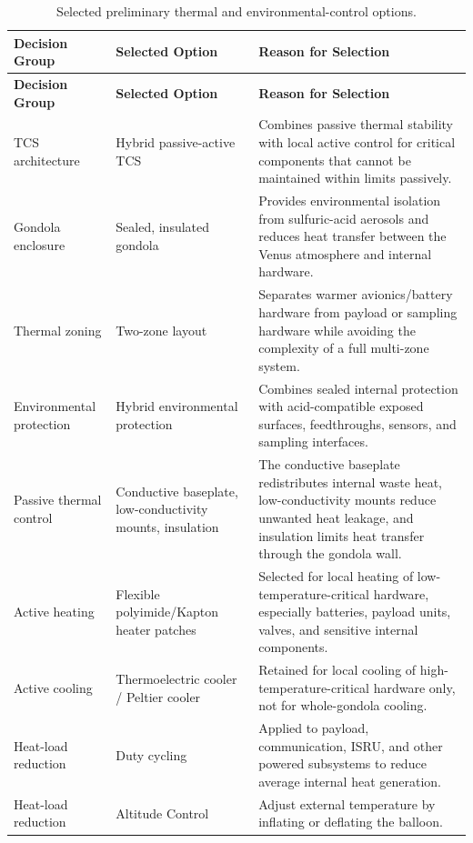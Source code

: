 \begin{longtable}{|p{2.5cm}|p{3.4cm}|p{8.6cm}|}
\caption{Selected preliminary thermal and environmental-control options.}
\label{tab:selected_tcs_options}\\
\hline
\textbf{Decision Group} &
\textbf{Selected Option} &
\textbf{Reason for Selection} \\
\hline
\endfirsthead

\hline
\textbf{Decision Group} &
\textbf{Selected Option} &
\textbf{Reason for Selection} \\
\hline
\endhead

TCS architecture &
Hybrid passive-active TCS &
Combines passive thermal stability with local active control for critical components that cannot be maintained within limits passively. \\
\hline

Gondola enclosure &
Sealed, insulated gondola &
Provides environmental isolation from sulfuric-acid aerosols and reduces heat transfer between the Venus atmosphere and internal hardware. \\
\hline

Thermal zoning &
Two-zone layout &
Separates warmer avionics/battery hardware from payload or sampling hardware while avoiding the complexity of a full multi-zone system. \\
\hline

Environmental protection &
Hybrid environmental protection &
Combines sealed internal protection with acid-compatible exposed surfaces, feedthroughs, sensors, and sampling interfaces. \\
\hline

Passive thermal control &
Conductive baseplate, low-conductivity mounts, insulation &
The conductive baseplate redistributes internal waste heat, low-conductivity mounts reduce unwanted heat leakage, and insulation limits heat transfer through the gondola wall. \\
\hline

Active heating &
Flexible polyimide/Kapton heater patches &
Selected for local heating of low-temperature-critical hardware, especially batteries, payload units, valves, and sensitive internal components. \\
\hline

Active cooling &
Thermoelectric cooler / Peltier cooler &
Retained for local cooling of high-temperature-critical hardware only, not for whole-gondola cooling. \\
\hline

Heat-load reduction &
Duty cycling  &
Applied to payload, communication, ISRU, and other powered subsystems to reduce average internal heat generation. \\
\hline

Heat-load reduction &
Altitude Control  &
Adjust external temperature by inflating or deflating the balloon. \\
\hline

\end{longtable}

